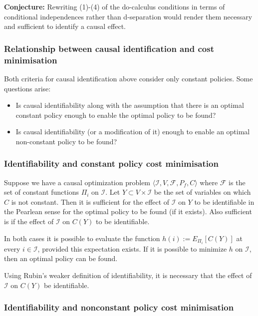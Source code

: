 \textbf{Conjecture:} Rewriting (1)-(4) of the do-calculus conditions in terms of conditional independences rather than d-separation would render them necessary and sufficient to identify a causal effect.

\subsubsection{Relationship between causal identification and cost minimisation}

Both criteria for causal identification above consider only constant policies. Some questions arise:
\begin{itemize}
    \item Is causal identifiability along with the assumption that there is an optimal constant policy enough to enable the optimal policy to be found?
    \item Is causal identifiability (or a modification of it) enough to enable an optimal non-constant policy to be found?
\end{itemize}

\subsubsection{Identifiability and constant policy cost minimisation}

Suppose we have a causal optimization problem $\langle \mathcal{I}, V, \mathcal{F}, P_f, C\rangle$ where $\mathcal{F}$ is the set of constant functions $\Pi_i$ on $\mathcal{I}$. Let $Y\subset V\times\mathcal{I}$ be the set of variables on which $C$ is not constant. Then it is sufficient for the effect of $\mathcal{I}$ on $Y$ to be identifiable in the Pearlean sense for the optimal policy to be found (if it exists). Also sufficient is if the effect of $\mathcal{I}$ on $C(Y)$ to be identifiable.

In both cases it is possible to evaluate the function $h(i):= E_{\Pi_i}[C(Y)]$ at every $i\in\mathcal{I}$, provided this expectation exists. If it is possible to minimize $h$ on $\mathcal{I}$, then an optimal policy can be found.

Using Rubin's weaker definition of identifiability, it is necessary that the effect of $\mathcal{I}$ on $C(Y)$ be identifiable.

\subsubsection{Identifiability and nonconstant policy cost minimisation}

